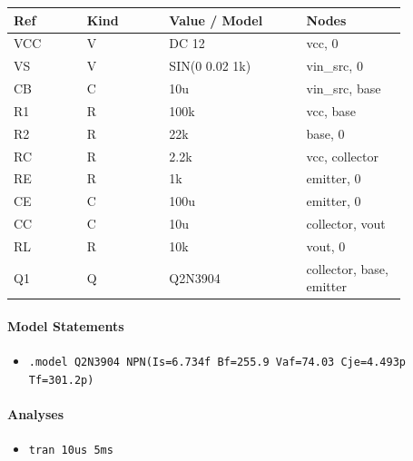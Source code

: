 \begin{longtable}{p{0.16\linewidth}p{0.18\linewidth}p{0.30\linewidth}p{0.22\linewidth}}
\textbf{Ref} & \textbf{Kind} & \textbf{Value / Model} & \textbf{Nodes}\\
\hline
VCC & V & DC 12 & vcc, 0\\
VS & V & SIN(0 0.02 1k) & vin\_src, 0\\
CB & C & 10u & vin\_src, base\\
R1 & R & 100k & vcc, base\\
R2 & R & 22k & base, 0\\
RC & R & 2.2k & vcc, collector\\
RE & R & 1k & emitter, 0\\
CE & C & 100u & emitter, 0\\
CC & C & 10u & collector, vout\\
RL & R & 10k & vout, 0\\
Q1 & Q & Q2N3904 & collector, base, emitter\\
\end{longtable}

\paragraph{Model Statements}
\begin{itemize}
  \item \texttt{.model Q2N3904 NPN(Is=6.734f Bf=255.9 Vaf=74.03 Cje=4.493p Tf=301.2p)}
\end{itemize}

\paragraph{Analyses}
\begin{itemize}
  \item \texttt{tran 10us 5ms}
\end{itemize}
